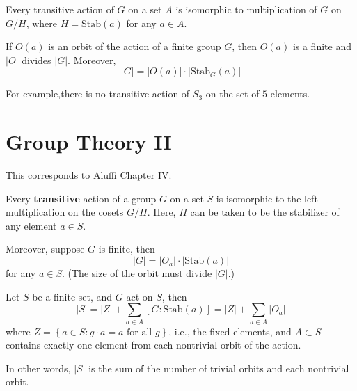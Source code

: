 \documentclass[openany]{book}
\begin{document}
\begin{prop}
    Every transitive action of $G$ on a set $A$ is isomorphic to multiplication of $G$ on $G/H$, where $H=\text{Stab}(a)$ for any $a\in A$.
\end{prop}


\begin{prop}
    If $O(a)$ is an orbit of the action of a finite group $G$, then $O(a)$ is a finite and $|O|$ divides $|G|$. Moreover, 
    \begin{equation*}
        |G|=|O(a)|\cdot|\text{Stab}_G(a)|
    \end{equation*}

    For example,there is no transitive action of $S_3$ on the set of $5$ elements. 
\end{prop}





\chapter{Group Theory II}
This corresponds to Aluffi Chapter IV.


\begin{prop}
    Every \textbf{transitive} action of a group $G$ on a set $S$ is isomorphic to the left multiplication on the cosets $G/H$. Here, $H$ can be taken to be the stabilizer of any element $a\in S$. 

    Moreover, suppose $G$ is finite, then 
    \begin{equation*}
        |G|=|O_a|\cdot|\text{Stab}(a)|
    \end{equation*}
    for any $a\in S$. (The size of the orbit must divide $|G|$.)
\end{prop}



\begin{prop}
    Let $S$ be a finite set, and $G$ act on $S$, then 
    \begin{equation*}
        |S|=|Z|+\sum_{a\in A}[G: \text{Stab}(a)]=|Z|+\sum_{a\in A}|O_a|
    \end{equation*} 
    where $Z=\left\{a\in S: g\cdot a=a\text{ for all } g\right\}$, i.e., the fixed elements, and $A\subset S$ contains exactly one element from each nontrivial orbit of the action. 
    
    In other words, $|S|$ is the sum of the number of trivial orbits and each nontrivial orbit.
\end{prop}
\end{document}

